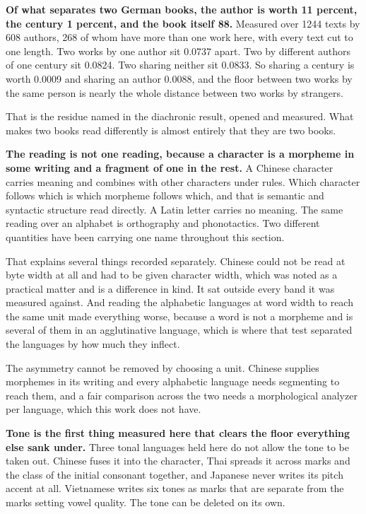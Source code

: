\textbf{Of what separates two German books, the author is worth 11 percent, the century 1 percent, and the book itself 88.} Measured over 1244 texts by 608 authors, 268 of whom have more than one work here, with every text cut to one length. Two works by one author sit 0.0737 apart. Two by different authors of one century sit 0.0824. Two sharing neither sit 0.0833. So sharing a century is worth 0.0009 and sharing an author 0.0088, and the floor between two works by the same person is nearly the whole distance between two works by strangers.

That is the residue named in the diachronic result, opened and measured. What makes two books read differently is almost entirely that they are two books.

\textbf{The reading is not one reading, because a character is a morpheme in some writing and a fragment of one in the rest.} A Chinese character carries meaning and combines with other characters under rules. Which character follows which is which morpheme follows which, and that is semantic and syntactic structure read directly. A Latin letter carries no meaning. The same reading over an alphabet is orthography and phonotactics. Two different quantities have been carrying one name throughout this section.

That explains several things recorded separately. Chinese could not be read at byte width at all and had to be given character width, which was noted as a practical matter and is a difference in kind. It sat outside every band it was measured against. And reading the alphabetic languages at word width to reach the same unit made everything worse, because a word is not a morpheme and is several of them in an agglutinative language, which is where that test separated the languages by how much they inflect.

The asymmetry cannot be removed by choosing a unit. Chinese supplies morphemes in its writing and every alphabetic language needs segmenting to reach them, and a fair comparison across the two needs a morphological analyzer per language, which this work does not have.

\textbf{Tone is the first thing measured here that clears the floor everything else sank under.} Three tonal languages held here do not allow the tone to be taken out. Chinese fuses it into the character, Thai spreads it across marks and the class of the initial consonant together, and Japanese never writes its pitch accent at all. Vietnamese writes six tones as marks that are separate from the marks setting vowel quality. The tone can be deleted on its own.

